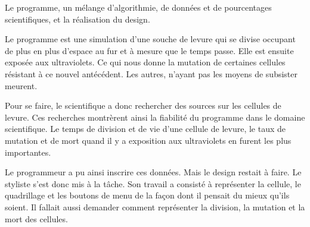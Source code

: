 Le programme, un mélange d'algorithmie, de données et de pourcentages scientifiques, et la réalisation du design.

Le programme est une simulation d'une souche de levure qui se divise occupant de plus en plus d'espace au fur et à mesure que le temps passe. Elle est ensuite exposée aux ultraviolets. Ce qui nous donne la mutation de certaines cellules résistant à ce nouvel antécédent. Les autres, n'ayant pas les moyens de subsister meurent.

Pour se faire, le scientifique a donc rechercher des sources sur les cellules de levure. Ces recherches montrèrent ainsi la fiabilité du programme dans le domaine scientifique. Le temps de division et de vie d'une cellule de levure, le taux de mutation et de mort quand il y a exposition aux ultraviolets en furent les plus importantes.

Le programmeur a pu ainsi inscrire ces données. Mais le design restait à faire.  Le styliste s'est donc mis à la tâche. Son travail a consisté à représenter la cellule, le quadrillage et les boutons de menu de la façon dont il pensait du mieux qu'ils soient. Il fallait aussi demander comment représenter la division, la mutation et la mort des cellules.
